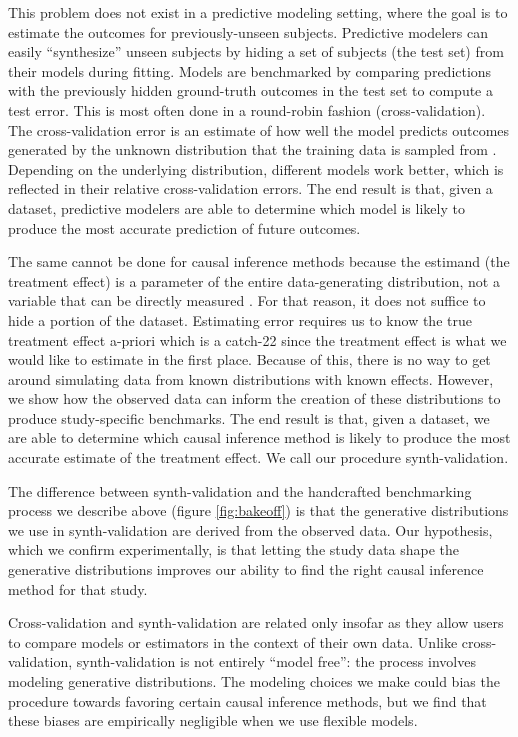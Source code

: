 This problem does not exist in a predictive modeling setting, where the goal is to estimate the outcomes for previously-unseen subjects. Predictive modelers can easily ``synthesize'' unseen subjects by hiding a set of subjects (the test set) from their models during fitting. Models are benchmarked by comparing predictions with the previously hidden ground-truth outcomes in the test set to compute a test error. This is most often done in a round-robin fashion (cross-validation). The cross-validation error is an estimate of how well the model predicts outcomes generated by the unknown distribution that the training data is sampled from \cite{Hastie:2009fg}. Depending on the underlying distribution, different models work better, which is reflected in their relative cross-validation errors. The end result is that, given a dataset, predictive modelers are able to determine which model is likely to produce the most accurate prediction of future outcomes.

The same cannot be done for causal inference methods because the estimand (the treatment effect) is a parameter of the entire data-generating distribution, not a variable that can be directly measured \cite{Shmueli:2010ec}. For that reason, it does not suffice to hide a portion of the dataset. Estimating error requires us to know the true treatment effect a-priori which is a catch-22 since the treatment effect is what we would like to estimate in the first place. Because of this, there is no way to get around simulating data from known distributions with known effects. However, we show how the observed data can inform the creation of these distributions to produce study-specific benchmarks. The end result is that, given a dataset, we are able to determine which causal inference method is likely to produce the most accurate estimate of the treatment effect. We call our procedure synth-validation.

The difference between synth-validation and the handcrafted benchmarking process we describe above (figure \ref{fig:bakeoff}) is that the generative distributions we use in synth-validation are derived from the observed data. Our hypothesis, which we confirm experimentally, is that letting the study data shape the generative distributions improves our ability to find the right causal inference method for that study.

Cross-validation and synth-validation are related only insofar as they allow users to compare models or estimators in the context of their own data. Unlike cross-validation, synth-validation is not entirely ``model free'': the process involves modeling generative distributions. The modeling choices we make could bias the procedure towards favoring certain causal inference methods, but we find that these biases are empirically negligible when we use flexible models. 

